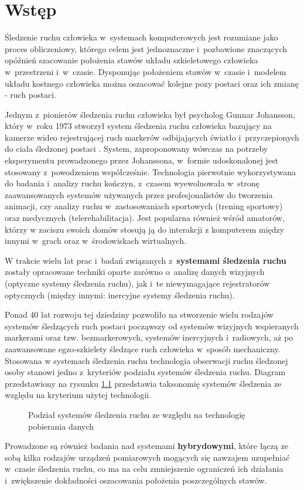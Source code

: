 
\chapter{Wstęp}\label{chap:intro}
Śledzenie ruchu człowieka w~systemach komputerowych jest rozumiane jako proces obliczeniowy, którego celem jest jednoznaczne i~pozbawione znaczących opóźnień szacowanie położenia stawów układu szkieletowego człowieka w~przestrzeni i~w~czasie. Dysponując położeniem stawów w~czasie i~modelem układu kostnego człowieka można oszacować kolejne pozy postaci oraz ich zmianę - ruch postaci.

Jednym z~pionierów śledzenia ruchu człowieka był psycholog Gunnar Johansson, który w~roku 1973 stworzył system śledzenia ruchu człowieka bazujący na kamerze wideo rejestrującej ruch markerów odbijających światło i~przyczepionych do ciała śledzonej postaci \cite{Johansson1973}. System, zaproponowany wówczas na potrzeby eksperymentu prowadzonego przez Johanssona, w~formie udoskonalonej jest stosowany z~powodzeniem współcześnie. Technologia pierwotnie wykorzystywana do badania i~analizy ruchu kończyn, z~czasem wyewoluowała w~stronę zaawansowanych systemów używanych przez profesjonalistów do tworzenia animacji, czy analizy ruchu w~zastosowaniach sportowych (trening sportowy) oraz medycznych (telerehabilitacja). Jest popularna również wśród amatorów, którzy w zaciszu swoich domów stosują ją do interakcji z komputerem między innymi w~grach oraz w~środowiskach wirtualnych.

W trakcie wielu lat prac i~badań związanych z~\textbf{systemami śledzenia ruchu} zostały opracowane techniki oparte zarówno o~analizę danych wizyjnych (optyczne systemy śledzenia ruchu), jak i~te niewymagające rejestratorów optycznych (między innymi: inercyjne systemy śledzenia ruchu).

Ponad 40 lat rozwoju tej dziedziny pozwoliło na stworzenie wielu rodzajów systemów śledzących ruch postaci począwszy od systemów wizyjnych wspieranych markerami oraz tzw. bezmarkerowych, systemów inercyjnych i~radiowych, aż po zaawansowane egzo-szkielety śledzące ruch człowieka w~sposób mechaniczny. Stosowana w systemach śledzenia ruchu technologia obserwacji ruchu śledzonej osoby stanowi jedno z~kryteriów podziału systemów śledzenia ruchu. Diagram przedstawiony na rysunku \ref{fig:literature:mocapSystems:diagram} przedstawia taksonomię systemów śledzenia ze względu na kryterium użytej technologii.

\begin{savenotes}
	\begin{figure}[H]
		\centering
		
		\caption{Podział systemów śledzenia ruchu ze względu na technologię pobierania danych}
		\label{fig:literature:mocapSystems:diagram}
	\end{figure}
\end{savenotes}
Prowadzone są również badania nad systemami \textbf{hybrydowymi}, które łączą ze sobą kilka rodzajów urządzeń pomiarowych mogących się nawzajem uzupełniać w~czasie śledzenia ruchu, co ma na celu zmniejszenie ograniczeń ich działania i~zwiększenie dokładności oszacowania położenia poszczególnych stawów.

